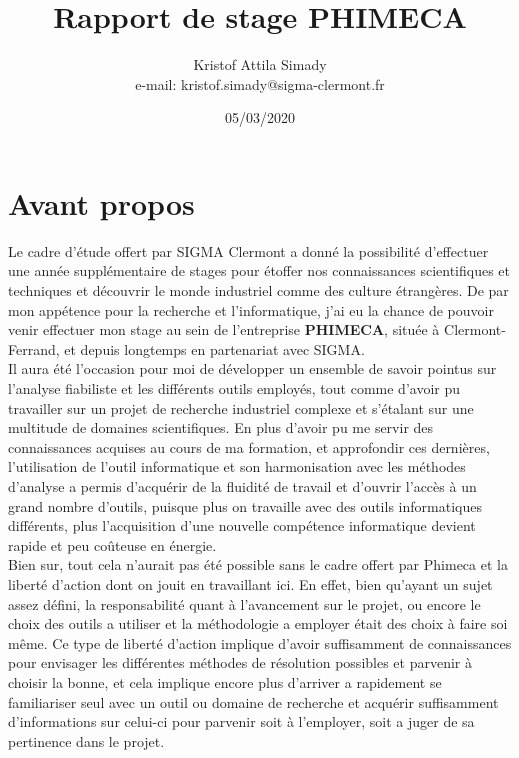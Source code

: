 \documentclass[a4paper,10pt]{article}
\begin{document}
%
   \title{Rapport de stage PHIMECA}

   \author{Kristof Attila Simady \\ e-mail: kristof.simady@sigma-clermont.fr}
          
   \date{05/03/2020}

   \maketitle
   
   \tableofcontents
 
  \newpage
    
\section*{Avant propos}

Le cadre d'étude offert par SIGMA Clermont a donné la possibilité d’effectuer une année supplémentaire de stages pour étoffer nos connaissances scientifiques et techniques  et découvrir le monde industriel comme des culture étrangères.
De par mon appétence pour la recherche et l'informatique, j'ai eu la chance de pouvoir venir effectuer mon stage au sein de l'entreprise \textbf{PHIMECA}, située à Clermont-Ferrand, et depuis longtemps en partenariat avec SIGMA. \\

Il aura été l'occasion pour moi de développer un ensemble de savoir pointus sur l'analyse fiabiliste et les différents outils employés, tout comme d'avoir pu travailler sur un projet de recherche industriel complexe et s'étalant sur une multitude de domaines scientifiques. En plus d'avoir pu me servir des connaissances acquises au cours de ma formation, et approfondir ces dernières, l'utilisation de l'outil informatique et son harmonisation avec les méthodes d'analyse a permis d'acquérir de la fluidité de travail et d'ouvrir l'accès à un grand nombre d'outils, puisque plus on travaille avec des outils informatiques différents, plus l'acquisition d'une nouvelle compétence informatique devient rapide et peu coûteuse en énergie. \\

Bien sur, tout cela n'aurait pas été possible sans le cadre offert par Phimeca et la liberté d'action dont on jouit en travaillant ici. En effet, bien qu'ayant un sujet assez défini, la responsabilité quant à l'avancement sur le projet, ou encore le choix des outils a utiliser et la méthodologie a employer était des choix à faire soi même. Ce type de liberté d'action implique d'avoir suffisamment de connaissances pour envisager les différentes méthodes de résolution possibles et parvenir à choisir la bonne, et cela implique encore plus d'arriver a rapidement se familiariser seul avec un outil ou domaine de recherche et acquérir suffisamment d'informations sur celui-ci pour parvenir soit à l'employer, soit a juger de sa pertinence dans le projet. \\
\end{document}
